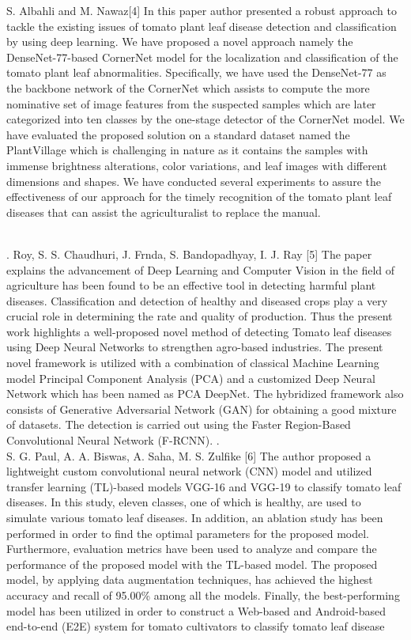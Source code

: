 \documentclass[12pt, English]{article}
\begin{document}
\begin{normalsize}
S. Albahli and M. Nawaz[4] 
In this paper author  presented a robust approach to tackle the existing issues of tomato plant leaf disease detection and classification by using deep learning. We have proposed a novel approach namely the DenseNet-77-based CornerNet model for the localization and classification of the tomato plant leaf abnormalities. Specifically, we have used the DenseNet-77 as the backbone network of the CornerNet which assists to compute the more nominative set of image features from the suspected samples which are later categorized into ten classes by the one-stage detector of the CornerNet model. We have evaluated the proposed solution on a standard dataset named the PlantVillage which is challenging in nature as it contains the samples with immense brightness alterations, color variations, and leaf images with different dimensions and shapes. We have conducted several experiments to assure the effectiveness of our approach for the timely recognition of the tomato plant leaf diseases that can assist the agriculturalist to replace the manual.
\\
\\
\newpge

. Roy, S. S. Chaudhuri, J. Frnda, S. Bandopadhyay, I. J. Ray [5] 
The paper explains the advancement of Deep Learning and Computer Vision in the field of agriculture has been found to be an effective tool in detecting harmful plant diseases. Classification and detection of healthy and diseased crops play a very crucial role in determining the rate and quality of production. Thus the present work highlights a well-proposed novel method of detecting Tomato leaf diseases using Deep Neural Networks to strengthen agro-based industries. The present novel framework is utilized with a combination of classical Machine Learning model Principal Component Analysis (PCA) and a customized Deep Neural Network which has been named as PCA DeepNet. The hybridized framework also consists of Generative Adversarial Network (GAN) for obtaining a good mixture of datasets. The detection is carried out using the Faster Region-Based Convolutional Neural Network (F-RCNN). .\\


S. G. Paul, A. A. Biswas, A. Saha, M. S. Zulfike [6] The author  proposed a lightweight custom convolutional neural network (CNN) model and utilized transfer learning (TL)-based models VGG-16 and VGG-19 to classify tomato leaf diseases. In this study, eleven classes, one of which is healthy, are used to simulate various tomato leaf diseases. In addition, an ablation study has been performed in order to find the optimal parameters for the proposed model. Furthermore, evaluation metrics have been used to analyze and compare the performance of the proposed model with the TL-based model. The proposed model, by applying data augmentation techniques, has achieved the highest accuracy and recall of 95.00\% among all the models. Finally, the best-performing model has been utilized in order to construct a Web-based and Android-based end-to-end (E2E) system for tomato cultivators to classify tomato leaf disease\\



\end{normalsize}
\end{document}
